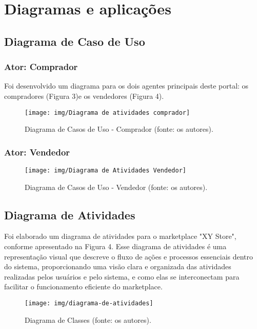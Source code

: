\documentclass[
	12pt,				%
	openright,			%
	twoside,			%
	a4paper,			%
	english,			%
	brazil				%
	]{abntex2}
\begin{document}
\chapter{Diagramas e aplicações}\label{cap_diagama_de_aplicacoes}

\section{Diagrama de Caso de Uso}

\subsection{Ator: Comprador}

Foi desenvolvido um diagrama para os dois agentes principais deste portal: os compradores (Figura 3)e os vendedores (Figura 4).

\begin{figure}[htb]
	\centering
	\texttt{[image: img/Diagrama de atividades comprador]}
	\caption{Diagrama de Casos de Uso - Comprador (fonte: os autores).}
	\label{fig:diagrama-de-casos-comprador}
\end{figure}

\subsection{Ator: Vendedor}

\begin{figure}[htb]
	\centering
	\texttt{[image: img/Diagrama de Atividades Vendedor]}
	\caption{Diagrama de Casos de Uso - Vendedor (fonte: os autores).}
	\label{fig:diagrama-de-casos-vendedor}
\end{figure}


\section{Diagrama de Atividades}

Foi elaborado um diagrama de atividades para o marketplace "XY Store", conforme apresentado na Figura 4. Esse diagrama de atividades é uma representação visual que descreve o fluxo de ações e processos essenciais dentro do sistema, proporcionando uma visão clara e organizada das atividades realizadas pelos usuários e pelo sistema, e como elas se interconectam para facilitar o funcionamento eficiente do marketplace.

\begin{figure}[htb]
	\centering
	\texttt{[image: img/diagrama-de-atividades]}
	\caption{Diagrama de Classes (fonte: os autores).}
	\label{fig:diagrama-de-atividades}
\end{figure}
\end{document}
